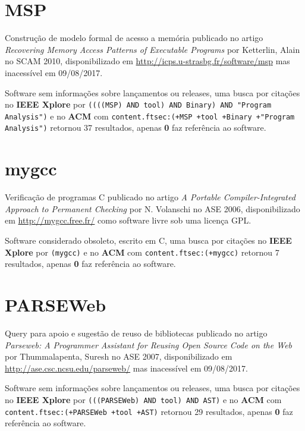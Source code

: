 \section{MSP}

Construção de modelo formal de acesso a memória
publicado no artigo {\it Recovering Memory Access Patterns of Executable Programs}
por Ketterlin, Alain
no SCAM 2010,
disponibilizado em \url{http://icps.u-strasbg.fr/software/msp}
mas inacessível em 09/08/2017.

Software sem informações sobre lançamentos ou releases,
uma busca por citações no {\bf IEEE Xplore} por
\texttt{((((MSP) AND tool) AND Binary) AND "Program Analysis")}
e no {\bf ACM} com
\texttt{content.ftsec:(+MSP +tool +Binary +"Program Analysis")}
retornou
37 resultados, apenas
{\bf 0} faz referência ao software.



\section{mygcc}

Verificação de programas C
publicado no artigo {\it A Portable Compiler-Integrated Approach to Permanent Checking}
por N. Volanschi
no ASE 2006,
disponibilizado em \url{http://mygcc.free.fr/}
como software livre
sob uma licença GPL.

Software considerado obsoleto,
escrito em C,
uma busca por citações no {\bf IEEE Xplore} por
\texttt{(mygcc)}
e no {\bf ACM} com
\texttt{content.ftsec:(+mygcc)}
retornou
7 resultados, apenas
{\bf 0} faz referência ao software.



\section{PARSEWeb}

Query para apoio e sugestão de reuso de bibliotecas
publicado no artigo {\it Parseweb: A Programmer Assistant for Reusing Open Source Code on the Web}
por Thummalapenta, Suresh
no ASE 2007,
disponibilizado em \url{http://ase.csc.ncsu.edu/parseweb/}
mas inacessível em 09/08/2017.

Software sem informações sobre lançamentos ou releases,
uma busca por citações no {\bf IEEE Xplore} por
\texttt{(((PARSEWeb) AND tool) AND AST)}
e no {\bf ACM} com
\texttt{content.ftsec:(+PARSEWeb +tool +AST)}
retornou
29 resultados, apenas
{\bf 0} faz referência ao software.



